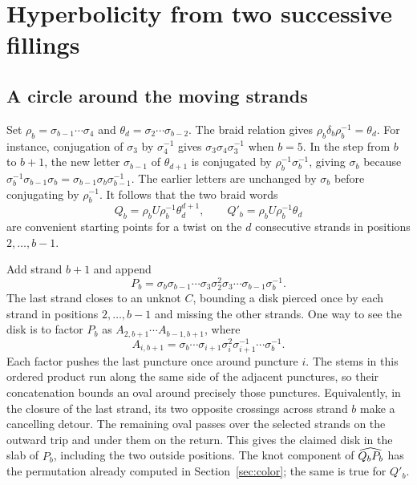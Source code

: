 \section{Hyperbolicity from two successive fillings}\label{sec:geometry}

\subsection{A circle around the moving strands}

Set \(\rho_b=\sigma_{b-1}\cdots\sigma_4\) and
\(\theta_d=\sigma_2\cdots\sigma_{b-2}\). The braid relation gives
\(\rho_b\delta_b\rho_b^{-1}=\theta_d\). For instance,
conjugation of \(\sigma_3\) by \(\sigma_4^{-1}\) gives
\(\sigma_3\sigma_4\sigma_3^{-1}\) when \(b=5\).
In the step from \(b\) to \(b+1\), the new letter
\(\sigma_{b-1}\) of \(\theta_{d+1}\) is conjugated by
\(\rho_b^{-1}\sigma_b^{-1}\), giving \(\sigma_b\) because
\(\sigma_b^{-1}\sigma_{b-1}\sigma_b
=\sigma_{b-1}\sigma_b\sigma_{b-1}^{-1}\).
The earlier letters are unchanged by \(\sigma_b\) before conjugating
by \(\rho_b^{-1}\). It follows that the two braid words
\[
 Q_b=\rho_bU\rho_b^{-1}\theta_d^{d+1},
 \qquad Q'_b=\rho_bU\rho_b^{-1}\theta_d
\]
are convenient starting points for a twist on the \(d\) consecutive
strands in positions \(2,\ldots,b-1\).

Add strand \(b+1\) and append
\[
       P_b=\sigma_b\sigma_{b-1}\cdots\sigma_3\sigma_2^2
                         \sigma_3\cdots\sigma_{b-1}\sigma_b^{-1}.
\]
The last strand closes to an unknot \(C\), bounding a disk pierced
once by each strand in positions \(2,\ldots,b-1\) and missing the
other strands. One way to see the disk is to factor \(P_b\) as
\(A_{2,b+1}\cdots A_{b-1,b+1}\), where
\[
  A_{i,b+1}=\sigma_b\cdots\sigma_{i+1}\sigma_i^2
                          \sigma_{i+1}^{-1}\cdots\sigma_b^{-1}.
\]
Each factor pushes the last puncture once around puncture \(i\).
The stems in this ordered product run along the same side of the
adjacent punctures, so their concatenation bounds an oval around
precisely those punctures. Equivalently, in the closure of the last
strand, its two opposite crossings across strand \(b\) make a
cancelling detour. The remaining oval passes over the selected strands
on the outward trip and under them on the return. This gives the claimed
disk in the slab of \(P_b\), including the two outside positions.
The knot component of \(\widehat{Q_bP_b}\) has the permutation already
computed in Section~\ref{sec:color}; the same is true for \(Q'_b\).

